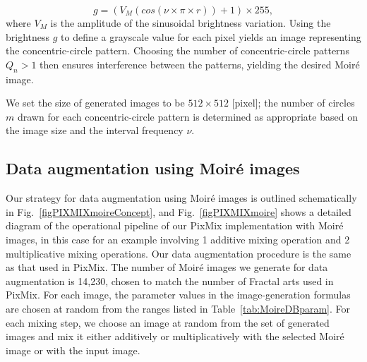 \begin{equation}
g=(V_M(cos(\nu \times \pi \times r)) + 1)\times255,
\end{equation}
%
where $V_M$ is the amplitude of the sinusoidal brightness variation.
Using the brightness $g$ to define a grayscale value for each pixel
yields an image representing the concentric-circle pattern. Choosing
the number of concentric-circle patterns $Q_n>1$ then ensures
interference between the patterns, yielding the desired Moir\'e image.

We set the size of generated images to be $512\times 512$ [pixel];
the number of circles $m$ drawn for each concentric-circle pattern
is determined as appropriate based on the image size and the 
interval frequency $\nu$.

\tabA
\tabNoise
\tabBlur

\subsection{Data augmentation using Moir\'e images}
\label{sec:MoireMIX-Render}

Our strategy for data augmentation using Moir\'e images
is outlined schematically in Fig.~\ref{figPIXMIXmoireConcept},
and Fig.~\ref{figPIXMIXmoire} shows a detailed diagram
of the operational pipeline of our PixMix implementation
with Moir\'e images, in this case for an example involving
1 additive mixing operation and 2 multiplicative mixing
operations. Our data augmentation procedure is the same as
that used in PixMix.
The number of Moir\'e images we generate for data augmentation
is 14,230, chosen to match the number of Fractal arts used in PixMix.
For each image, the parameter values in the image-generation
formulas are chosen at random from the ranges listed in
Table~\ref{tab:MoireDBparam}.
For each mixing step, we choose an image at random from the 
set of generated images and mix it either additively or 
multiplicatively with the selected Moir\'e image or with 
the input image.

\tabWea
\tabDig
